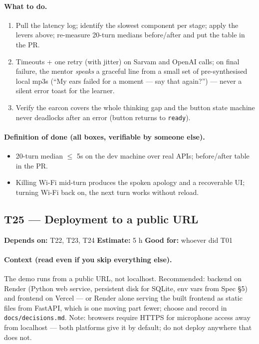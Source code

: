 \documentclass[11pt]{article}
\newcommand{\code}[1]{\texttt{#1}}
\newcommand{\taskmeta}[3]{\noindent\textbf{Depends on:} #1 \quad\textbullet\quad \textbf{Estimate:} #2 \quad\textbullet\quad \textbf{Good for:} #3\par\vspace{2pt}}
\newcommand{\ctx}[1]{\paragraph{Context (read even if you skip everything else).} #1}
\newcommand{\dod}{\paragraph{Definition of done (all boxes, verifiable by someone else).}}
\begin{document}
\paragraph{What to do.}
\begin{enumerate}
  \item Pull the latency log; identify the slowest component per stage; apply the levers above; re-measure 20-turn medians before/after and put the table in the PR.
  \item Timeouts + one retry (with jitter) on Sarvam and OpenAI calls; on final failure, the mentor \emph{speaks} a graceful line from a small set of pre-synthesised local mp3s (``My ears failed for a moment --- say that again?'') --- never a silent error toast for the learner.
  \item Verify the earcon covers the whole thinking gap and the button state machine never deadlocks after an error (button returns to \code{ready}).
\end{enumerate}
\dod
\begin{itemize}
  \item 20-turn median $\leq$ 5s on the dev machine over real APIs; before/after table in the PR.
  \item Killing Wi-Fi mid-turn produces the spoken apology and a recoverable UI; turning Wi-Fi back on, the next turn works without reload.
\end{itemize}

\subsection{T25 --- Deployment to a public URL}
\taskmeta{T22, T23, T24}{5 h}{whoever did T01}
\ctx{The demo runs from a public URL, not localhost. Recommended: backend on Render (Python web service, persistent disk for SQLite, env vars from Spec \S5) and frontend on Vercel --- or Render alone serving the built frontend as static files from FastAPI, which is one moving part fewer; choose and record in \code{docs/decisions.md}. Note: browsers require HTTPS for microphone access away from localhost --- both platforms give it by default; do not deploy anywhere that does not.}
\end{document}
